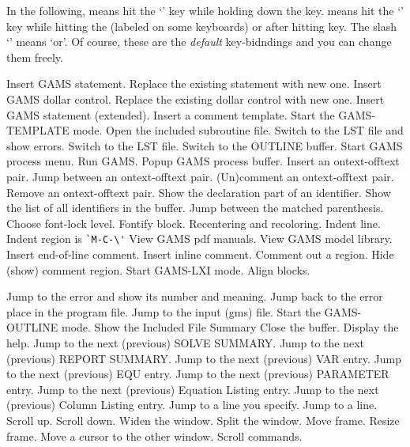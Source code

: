 \documentclass{article}
\begin{document}

In the following,  means hit the `' key while holding down
the  key.  means hit the `' key while hitting
the  (labeled  on some keyboards) or after hitting
 key.  The slash `\kbd{/}' means `or'.  Of course, these are
the {\it default} key-bidndings and you can change them freely.



 Insert GAMS statement.
 Replace the existing statement with new one.
 Insert GAMS dollar control.
 Replace the existing dollar control with new one.
 Insert GAMS statement (extended).
 Insert a comment template.
 Start the GAMS-TEMPLATE mode.
 Open the included subroutine file.
\key{} 
 Switch to the LST file and show errors.
 Switch to the LST file.
  Switch to the OUTLINE buffer.
\key{} 
  Start GAMS process menu.
  Run GAMS.
  Popup GAMS process buffer.
\key{} 
  Insert an ontext-offtext pair.
  Jump between an ontext-offtext pair.
  (Un)comment an ontext-offtext pair.
  Remove an ontext-offtext pair.
\key{} 
  Show the declaration part of an identifier.
  Show the list of all identifiers in the buffer.
  Jump between the matched parenthesis.
  Choose font-lock level.
  Fontify block.
  Recentering and recoloring.
  Indent line.
\key{} Indent region is \verb|`M-C-\'|
  View GAMS pdf manuals.
  View GAMS model library.
  Insert end-of-line comment.
  Insert inline comment.
  Comment out a region.
  Hide (show) comment region.
  Start GAMS-LXI mode.
  Align blocks.



   Jump to the error and show its number and meaning.
  Jump back to the error place in the program file.
  Jump to the input (gms) file.
  Start the GAMS-OUTLINE mode.
  Show the Included File Summary
\key{} 
  Close the buffer.
  Display the help.
\key{} 
  Jump to the next (previous) SOLVE SUMMARY.
  Jump to the next (previous) REPORT SUMMARY.
  Jump to the next (previous) VAR entry.
  Jump to the next (previous) EQU entry.
  Jump to the next (previous) PARAMETER entry.
  Jump to the next (previous) Equation Listing entry.
  Jump to the next (previous) Column Listing entry.
  Jump to a line you specify.
  Jump to a line.
\key{} 
  Scroll up.
  Scroll down.
  Widen the window.
  Split the window.
  Move frame.
  Resize frame.
  Move a cursor to the other window.
\key{} 
          Scroll commands.
\end{document}
